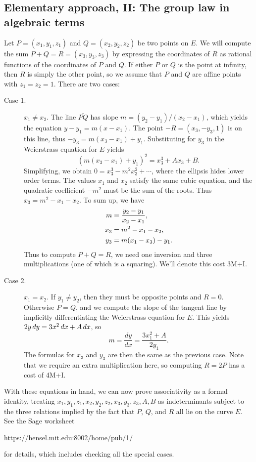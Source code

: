 \subsection{Elementary approach, II: The group law in algebraic terms}
Let $P=(x_1,y_1,z_1)$ and $Q=(x_2,y_2,z_2)$ be two points on $E$.
We will compute the sum $P+Q=R=(x_3,y_3,z_3)$ by expressing the coordinates of $R$ as rational functions of the coordinates of $P$ and $Q$.
If either $P$ or $Q$ is the point at infinity, then $R$ is simply the other point, so we assume that $P$ and $Q$ are affine points with $z_1=z_2=1$.
There are two cases:
\begin{description}
\item[Case 1.] $x_1\neq x_2$. The line $\overline{PQ}$ has slope
  $m=(y_2-y_1)/(x_2-x_1)$, which yields the equation $y-y_1=m(x-x_1)$.
  The point $-R=(x_3,-y_3,1)$ is on this line, thus $-y_3=m(x_3-x_1)+y_1$.
  Substituting for $y_3$ in the Weierstrass equation for $E$ yields
  $$(m(x_3-x_1)+y_1)^2=x_3^3+Ax_3+B.$$
  Simplifying, we obtain $0=x_3^3-m^2x_3^2+\cdots$, where the ellipsis hides lower order terms.
  The values $x_1$ and $x_2$ satisfy the same cubic equation, and the quadratic coefficient $-m^2$
  must be the sum of the roots.  Thus $x_3=m^2-x_1-x_2$.  To sum up, we have
\begin{align*}
m &= \frac{y_2-y_1}{x_2-x_1},\\
x_3 &= m^2-x_1-x_2,\\
y_3&=m(x_1-x_3)-y_1.
\end{align*}
  Thus to compute $P+Q=R$, we need one inversion and three multiplications (one of which is a squaring).
  We'll denote this cost 3M+I.

\item[Case 2.] $x_1=x_2$. If $y_1\neq y_2$, then they must be opposite
  points and $R=0$. Otherwise $P=Q$, and we compute the slope of the
  tangent line by implicitly differentiating the Weierstrass equation for $E$.
  This yields $2y\,dy=3x^2\,dx+A\,dx$, so 
\[m=\frac{dy}{dx}=\frac{3x_1^2+A}{2y_1}.\]
  The formulas for $x_3$ and $y_3$ are then the same as
  the previous case.  Note that we require an extra multiplication here,
  so computing $R=2P$ has a cost of 4M+I.
\end{description}

With these equations in hand, we can now prove associativity as a formal
identity, treating $x_1,y_1,z_1,x_2,y_2,z_2,x_3,y_3,z_3,A,B$ as indeterminants
subject to the three relations implied by the fact that $P$, $Q$, and
$R$ all lie on the curve $E$.  See the Sage worksheet
\begin{center}
\url{https://hensel.mit.edu:8002/home/pub/1/}
\end{center}
for details, which includes checking all the special cases.

